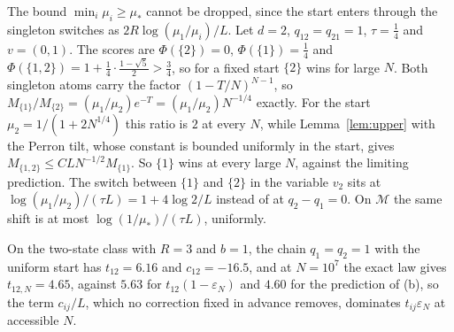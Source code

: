 \begin{remark}\label{rem:finite-start}
The bound $\min_i\mu_i\ge\mu_*$ cannot be dropped, since the start enters
through the singleton switches as $2R\log(\mu_1/\mu_i)/L$. Let $d=2$, $q_{12}=q_{21}=1$, $\tau=\frac14$ and $v=(0,1)$. The scores are
$\Phi(\{2\})=0$, $\Phi(\{1\})=\frac14$ and
$\Phi(\{1,2\})=1+\frac14\cdot\frac{1-\sqrt5}2>\frac34$, so for a fixed start
$\{2\}$ wins for large $N$. Both singleton atoms carry the factor
$(1-T/N)^{N-1}$, so $M_{\{1\}}/M_{\{2\}}=(\mu_1/\mu_2)e^{-T}=(\mu_1/\mu_2)N^{-1/4}$
exactly. For the start $\mu_2=1/(1+2N^{1/4})$ this ratio is $2$ at every $N$,
while Lemma~\ref{lem:upper} with the Perron tilt, whose constant is bounded
uniformly in the start, gives $M_{\{1,2\}}\le CLN^{-1/2}M_{\{1\}}$. So $\{1\}$
wins at every large $N$, against the limiting prediction. The switch between
$\{1\}$ and $\{2\}$ in the variable $v_2$ sits at
$\log(\mu_1/\mu_2)/(\tau L)=1+4\log2/L$ instead of at $q_2-q_1=0$. On
$\mathcal M$ the same shift is at most $\log(1/\mu_*)/(\tau L)$, uniformly.
\end{remark}

\begin{remark}\label{rem:finite-size}
On the two-state class with $R=3$ and $b=1$, the chain $q_1=q_2=1$ with the
uniform start has $t_{12}=6.16$ and $c_{12}=-16.5$, and at $N=10^7$ the exact law
gives $t_{12,N}=4.65$, against $5.63$ for $t_{12}(1-\varepsilon_N)$ and $4.60$ for
the prediction of (b), so the term $c_{ij}/L$, which no correction fixed in
advance removes, dominates $t_{ij}\varepsilon_N$ at accessible $N$.
\end{remark}
